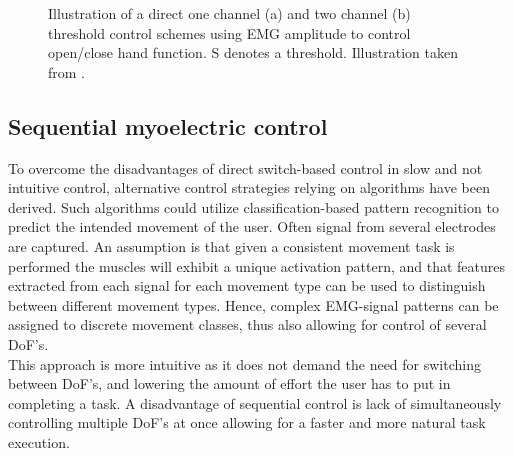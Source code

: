    
 \begin{figure}[H] 
 	\centering
 	\caption{Illustration of a direct one channel (a) and two channel (b) threshold control schemes using EMG amplitude to control open/close hand function. S denotes a threshold. Illustration taken from \cite{Parker2006}.}
 	\label{fig:Sw}
 \end{figure}  
   
   
\subsection{Sequential myoelectric control}

To overcome the disadvantages of direct switch-based control in slow and not intuitive control, alternative control strategies relying on algorithms have been derived. Such algorithms could utilize classification-based pattern recognition to predict the intended movement of the user. Often signal from several electrodes are captured. An assumption is that given a consistent movement task is performed the muscles will exhibit a unique activation pattern, and that features extracted from each signal for each movement type can be used to distinguish between different movement types. Hence, complex EMG-signal patterns can be assigned to discrete movement classes, thus also allowing for control of several DoF's.  \cite{Farina2014,Wurth2014}  \\
This approach is more intuitive as it does not demand the need for switching between DoF's, and lowering the amount of effort the user has to put in completing a task. A disadvantage of sequential control is lack of simultaneously controlling multiple DoF's at once allowing for a faster and more natural task execution. \cite{Farina2014}  

